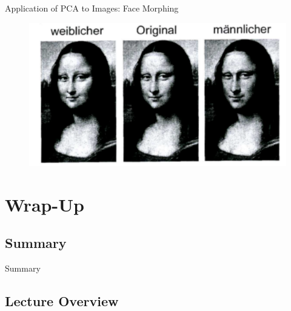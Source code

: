\begin{frame}{Application of PCA to Images: Face Morphing}{}
	\begin{figure}
		\centering
		\includegraphics[scale=0.35]{13_pca/02_img/face_morphing}
	\end{figure}
\end{frame}


\section{Wrap-Up}

\subsection{Summary}

\begin{frame}{Summary}{}

\end{frame}


\subsection{Lecture Overview}



